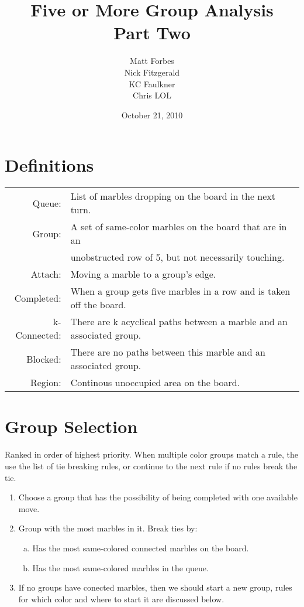 \documentclass[a4paper,12pt]{article}
\begin{document}
\title{Five or More Group Analysis\\ Part Two}
\date{October 21, 2010}
\author{Matt Forbes \\ Nick Fitzgerald \\ KC Faulkner \\ Chris LOL}
\maketitle

\section*{Definitions}
\begin{tabular}{r l}
    Queue:& List of marbles dropping on the board in the next turn. \\
    Group:& A set of same-color marbles on the board that are in an\\
    {}& unobstructed row of 5, but not necessarily touching. \\
    Attach:& Moving a marble to a group's edge.\\
    Completed:& When a group gets five marbles in a row and is taken off the board.\\
    k-Connected:& There are k acyclical paths between a marble and an associated group.\\
    Blocked:& There are no paths between this marble and an associated group.\\
    Region:& Continous unoccupied area on the board. 
    
\end{tabular}

\section*{Group Selection}

Ranked in order of highest priority. When multiple color groups match a rule, the use
the list of tie breaking rules, or continue to the next rule if no rules break the tie.

\begin{enumerate}[1)]

    \item Choose a group that has the possibility of being completed with one available move.

    \item Group with the most marbles in it. Break ties by:
        \begin{enumerate}[a)]
            \item Has the most same-colored connected marbles on the board.
            \item Has the most same-colored marbles in the queue. 
        \end{enumerate}

    \item If no groups have conected marbles, then we should start a new group, rules for which
        color and where to start it are discussed below.

\end{enumerate}
\end{document}
